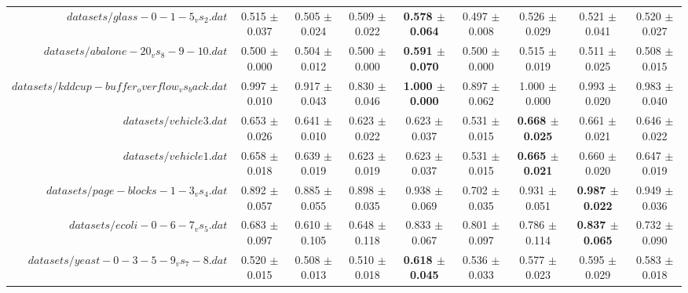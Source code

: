 \begin{table}[!ht]
{\begin{tabular}{r c c c c c c c c}
$datasets/glass-0-1-5_vs_2.dat$ & 0.515 $\pm$ 0.037 & 0.505 $\pm$ 0.024 & 0.509 $\pm$ 0.022 & \textbf{0.578 $\pm$ 0.064} & 0.497 $\pm$ 0.008 & 0.526 $\pm$ 0.029 & 0.521 $\pm$ 0.041 & 0.520 $\pm$ 0.027 \\
$datasets/abalone-20_vs_8-9-10.dat$ & 0.500 $\pm$ 0.000 & 0.504 $\pm$ 0.012 & 0.500 $\pm$ 0.000 & \textbf{0.591 $\pm$ 0.070} & 0.500 $\pm$ 0.000 & 0.515 $\pm$ 0.019 & 0.511 $\pm$ 0.025 & 0.508 $\pm$ 0.015 \\
$datasets/kddcup-buffer_overflow_vs_back.dat$ & 0.997 $\pm$ 0.010 & 0.917 $\pm$ 0.043 & 0.830 $\pm$ 0.046 & \textbf{1.000 $\pm$ 0.000} & 0.897 $\pm$ 0.062 & 1.000 $\pm$ 0.000 & 0.993 $\pm$ 0.020 & 0.983 $\pm$ 0.040 \\
$datasets/vehicle3.dat$ & 0.653 $\pm$ 0.026 & 0.641 $\pm$ 0.010 & 0.623 $\pm$ 0.022 & 0.623 $\pm$ 0.037 & 0.531 $\pm$ 0.015 & \textbf{0.668 $\pm$ 0.025} & 0.661 $\pm$ 0.021 & 0.646 $\pm$ 0.022 \\
$datasets/vehicle1.dat$ & 0.658 $\pm$ 0.018 & 0.639 $\pm$ 0.019 & 0.623 $\pm$ 0.019 & 0.623 $\pm$ 0.037 & 0.531 $\pm$ 0.015 & \textbf{0.665 $\pm$ 0.021} & 0.660 $\pm$ 0.020 & 0.647 $\pm$ 0.019 \\
$datasets/page-blocks-1-3_vs_4.dat$ & 0.892 $\pm$ 0.057 & 0.885 $\pm$ 0.055 & 0.898 $\pm$ 0.035 & 0.938 $\pm$ 0.069 & 0.702 $\pm$ 0.035 & 0.931 $\pm$ 0.051 & \textbf{0.987 $\pm$ 0.022} & 0.949 $\pm$ 0.036 \\
$datasets/ecoli-0-6-7_vs_5.dat$ & 0.683 $\pm$ 0.097 & 0.610 $\pm$ 0.105 & 0.648 $\pm$ 0.118 & 0.833 $\pm$ 0.067 & 0.801 $\pm$ 0.097 & 0.786 $\pm$ 0.114 & \textbf{0.837 $\pm$ 0.065} & 0.732 $\pm$ 0.090 \\
$datasets/yeast-0-3-5-9_vs_7-8.dat$ & 0.520 $\pm$ 0.015 & 0.508 $\pm$ 0.013 & 0.510 $\pm$ 0.018 & \textbf{0.618 $\pm$ 0.045} & 0.536 $\pm$ 0.033 & 0.577 $\pm$ 0.023 & 0.595 $\pm$ 0.029 & 0.583 $\pm$ 0.018 \\
\end{tabular}}
\end{table}
